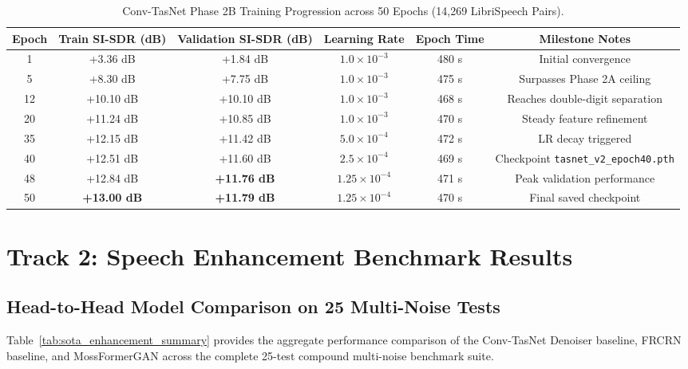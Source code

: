 \documentclass[11pt,a4paper]{report}
\begin{document}
\begin{table}[H]
\centering
\caption{Conv-TasNet Phase 2B Training Progression across 50 Epochs (14,269 LibriSpeech Pairs).}
\label{tab:training_progression}
\small
\begin{tabular}{cccccc}
\toprule
\textbf{Epoch} & \textbf{Train SI-SDR (dB)} & \textbf{Validation SI-SDR (dB)} & \textbf{Learning Rate} & \textbf{Epoch Time} & \textbf{Milestone Notes} \\
\midrule
1  & +3.36 dB  & +1.84 dB  & $1.0 \times 10^{-3}$ & 480 s & Initial convergence \\
5  & +8.30 dB  & +7.75 dB  & $1.0 \times 10^{-3}$ & 475 s & Surpasses Phase 2A ceiling \\
12 & +10.10 dB & +10.10 dB & $1.0 \times 10^{-3}$ & 468 s & Reaches double-digit separation \\
20 & +11.24 dB & +10.85 dB & $1.0 \times 10^{-3}$ & 470 s & Steady feature refinement \\
35 & +12.15 dB & +11.42 dB & $5.0 \times 10^{-4}$ & 472 s & LR decay triggered \\
40 & +12.51 dB & +11.60 dB & $2.5 \times 10^{-4}$ & 469 s & Checkpoint \texttt{tasnet\_v2\_epoch40.pth} \\
48 & +12.84 dB & \textbf{+11.76 dB} & $1.25 \times 10^{-4}$ & 471 s & Peak validation performance \\
50 & \textbf{+13.00 dB} & \textbf{+11.79 dB} & $1.25 \times 10^{-4}$ & 470 s & Final saved checkpoint \\
\bottomrule
\end{tabular}
\end{table}

\section{Track 2: Speech Enhancement Benchmark Results}
\subsection{Head-to-Head Model Comparison on 25 Multi-Noise Tests}
Table~\ref{tab:sota_enhancement_summary} provides the aggregate performance comparison of the Conv-TasNet Denoiser baseline, FRCRN baseline, and MossFormerGAN across the complete 25-test compound multi-noise benchmark suite.
\end{document}
